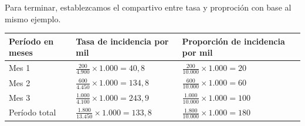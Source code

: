 \documentclass[
]{book}
\begin{document}
Para terminar, establezcamos el compartivo entre tasa y proproción con base al mismo ejemplo.

\begin{longtable}[]{@{}lll@{}}
\toprule
\begin{minipage}[b]{0.18\columnwidth}\raggedright
Período en meses\strut
\end{minipage} & \begin{minipage}[b]{0.36\columnwidth}\raggedright
Tasa de incidencia por mil\strut
\end{minipage} & \begin{minipage}[b]{0.37\columnwidth}\raggedright
Proporción de incidencia por mil\strut
\end{minipage}\tabularnewline
\midrule
\endhead
\begin{minipage}[t]{0.18\columnwidth}\raggedright
Mes 1\strut
\end{minipage} & \begin{minipage}[t]{0.36\columnwidth}\raggedright
\(\frac{200}{4.900}\times 1.000=40,8\)\strut
\end{minipage} & \begin{minipage}[t]{0.37\columnwidth}\raggedright
\(\frac{200}{10.000}\times 1.000=20\)\strut
\end{minipage}\tabularnewline
\begin{minipage}[t]{0.18\columnwidth}\raggedright
Mes 2\strut
\end{minipage} & \begin{minipage}[t]{0.36\columnwidth}\raggedright
\(\frac{600}{4.450}\times 1.000=134,8\)\strut
\end{minipage} & \begin{minipage}[t]{0.37\columnwidth}\raggedright
\(\frac{600}{10.000}\times 1.000=60\)\strut
\end{minipage}\tabularnewline
\begin{minipage}[t]{0.18\columnwidth}\raggedright
Mes 3\strut
\end{minipage} & \begin{minipage}[t]{0.36\columnwidth}\raggedright
\(\frac{1.000}{4.100}\times 1.000=243,9\)\strut
\end{minipage} & \begin{minipage}[t]{0.37\columnwidth}\raggedright
\(\frac{1.000}{10.000}\times 1.000=100\)\strut
\end{minipage}\tabularnewline
\begin{minipage}[t]{0.18\columnwidth}\raggedright
Período total\strut
\end{minipage} & \begin{minipage}[t]{0.36\columnwidth}\raggedright
\(\frac{1.800}{13.450}\times 1.000=133,8\)\strut
\end{minipage} & \begin{minipage}[t]{0.37\columnwidth}\raggedright
\(\frac{1.800}{10.000}\times 1.000=180\)\strut
\end{minipage}\tabularnewline
\bottomrule
\end{longtable}
\end{document}

